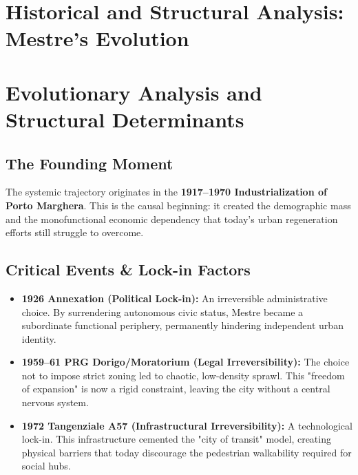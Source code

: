\documentclass[a4paper,11pt]{article}
\begin{document}
\section*{Historical and Structural Analysis: Mestre's Evolution}


\newpage

\section*{Evolutionary Analysis and Structural Determinants}

\subsection*{The Founding Moment}
The systemic trajectory originates in the \textbf{1917–1970 Industrialization of Porto Marghera}. This is the causal beginning: it created the demographic mass and the monofunctional economic dependency that today's urban regeneration efforts still struggle to overcome. 

\subsection*{Critical Events \& Lock-in Factors}
\begin{itemize}
    \item \textbf{1926 Annexation (Political Lock-in):} An irreversible administrative choice. By surrendering autonomous civic status, Mestre became a subordinate functional periphery, permanently hindering independent urban identity.
    \item \textbf{1959–61 PRG Dorigo/Moratorium (Legal Irreversibility):} The choice not to impose strict zoning led to chaotic, low-density sprawl. This "freedom of expansion" is now a rigid constraint, leaving the city without a central nervous system.
    \item \textbf{1972 Tangenziale A57 (Infrastructural Irreversibility):} A technological lock-in. This infrastructure cemented the "city of transit" model, creating physical barriers that today discourage the pedestrian walkability required for social hubs.
\end{itemize}
\end{document}
